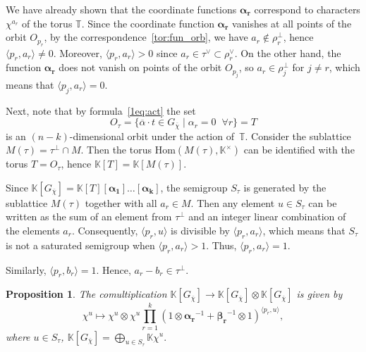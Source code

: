 \documentclass[a4paper, 11pt]{amsart}
\theoremstyle{plain}
\newtheorem{proposition}[theorem]{Proposition}
\theoremstyle{remark}
\theoremstyle{definition}
\newcommand{\KK}{\mathbb{K}}
\newcommand{\GG}{G_{\overline{\chi}}}
\newcommand{\TT}{\mathbb{T}}
\newcommand{\ol}[1]{\overline{#1}}
\newcommand{\Alp}[1]{\pmb{\alpha_{#1}}}
\newcommand{\Bet}[1]{\pmb{\beta_{#1}}}
\begin{document}
We have already shown that the coordinate functions $\Alp{r}$ correspond to characters $\chi^{a_r}$ of the torus $\TT$. Since the coordinate function $\Alp{r}$ vanishes at all points of the orbit $O_{p_r}$, by the correspondence~\eqref{tor:fun_orb}, we have $a_r \notin \rho_r^\perp$, hence $\langle p_r, a_r \rangle \neq 0$. Moreover, $\langle p_r, a_r \rangle > 0$ since ${a_r \in \tau^\vee \subset \rho_r^\vee}$. On the other hand, the function $\Alp{r}$ does not vanish on points of the orbit $O_{p_j}$, so $a_r \in \rho_j^\perp$ for $j \neq r$, which means that $\langle p_j, a_r \rangle = 0$.

Next, note that by formula~\eqref{1eq:act} the set 
\[O_\tau = \{ \ol{\alpha} \cdot t \in  \GG \mid \alpha_r = 0 \;\; \forall r\} = T\] is an $(n-k)$-dimensional orbit under the action of~$\TT$. Consider the sublattice ${M(\tau) = \tau^\perp \cap M}$. Then the torus $\text{Hom}(M(\tau), \KK^\times)$ can be identified with the torus $T = O_\tau$, hence $\KK[T] = \KK[M(\tau)].$

Since $\KK[\GG] = \KK[T][\Alp{1}]\ldots[\Alp{k}]$, the semigroup $S_\tau$ is generated by the sublattice $M(\tau)$ together with all $a_r \in M$. Then any element $u \in S_\tau$ can be written as the sum of an element from $\tau^\perp$ and an integer linear combination of the elements $a_r$. Consequently, $\langle p_r, u \rangle$ is divisible by $\langle p_r, a_r \rangle$, which means that $S_\tau$ is not a saturated semigroup when $\langle p_r, a_r\rangle > 1$. Thus, $\langle p_r, a_r \rangle = 1$.

Similarly, $\langle p_r, b_r \rangle = 1$. Hence, $a_r - b_r \in \tau^\perp$.	

\begin{proposition}\label{1l:comult} 
The comultiplication $\KK[\GG] \rightarrow \KK[\GG] \otimes \KK[\GG]$ is given by
\begin{equation}\label{1l:comu}
	\chi^u \mapsto \chi^u \otimes \chi^u \prod_{r = 1}^{k} (1 \otimes \Alp{r}^{-1} + \Bet{r}^{-1} \otimes 1)^{\langle p_r, u\rangle},
\end{equation}  
where $u \in S_\tau$, $\KK[\GG] = \bigoplus\limits_{u \in S_\tau} \KK \chi^u.$  
\end{proposition}
\end{document}
